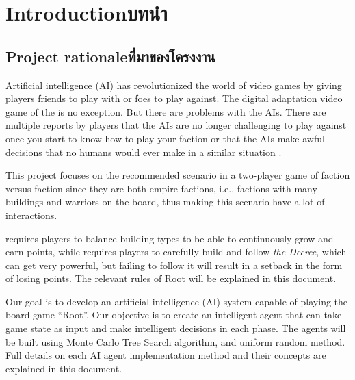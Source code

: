 \chapter{\ifenglish Introduction\else บทนำ\fi}

\section{\ifenglish Project rationale\else ที่มาของโครงงาน\fi}
Artificial intelligence (AI) has revolutionized the world of video games by giving players friends to play with or foes to play against. The digital adaptation video game of the \RootB{} is no exception. But there are problems with the AIs. There are multiple reports by \RootV{} players that the AIs are no longer challenging to play against once you start to know how to play your faction or that the AIs make awful decisions that no humans would ever make in a similar situation \cite{Steam_Review1} \cite{Steam_Review2} \cite{Reddit_AIInThisGameTooEasy}.

This project focuses on the recommended scenario in a two-player game of \Marquise{} faction versus \Eyrie{} faction since they are both empire factions, i.e., factions with many buildings and warriors on the board, thus making this scenario have a lot of interactions.

%
%
\Marquise{} requires players to balance building types to be able to continuously grow and earn points, while \Eyrie{} requires players to carefully build and follow \textit{the Decree}, which can get very powerful, but failing to follow it will result in a setback in the form of losing points. The relevant rules of Root will be explained in this document.
%

Our goal is to develop an artificial intelligence (AI) system capable of playing the board game ``Root''. Our objective is to create an intelligent agent that can take game state as input and make intelligent decisions in each phase. The agents will be built using Monte Carlo Tree Search algorithm, and uniform random method. Full details on each AI agent implementation method and their concepts are explained in this document.



